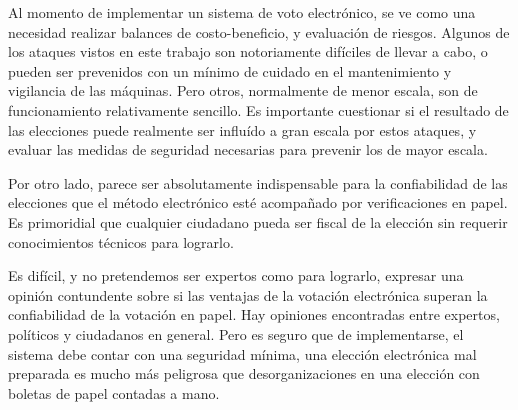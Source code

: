 \documentclass[11pt]{article}
\begin{document}
Al momento de implementar un sistema de voto electrónico, se ve como una necesidad realizar balances de costo-beneficio, y evaluación de riesgos. Algunos de los ataques vistos en este trabajo son notoriamente difíciles de llevar a cabo, o pueden ser prevenidos con un mínimo de cuidado en el mantenimiento y vigilancia de las máquinas. Pero otros, normalmente de menor escala, son de funcionamiento relativamente sencillo. Es importante cuestionar si el resultado de las elecciones puede realmente ser influído a gran escala por estos ataques, y evaluar las medidas de seguridad necesarias para prevenir los de mayor escala.

Por otro lado, parece ser absolutamente indispensable para la confiabilidad de las elecciones que el método electrónico esté acompañado por verificaciones en papel. Es primoridial que cualquier ciudadano pueda ser fiscal de la elección sin requerir conocimientos técnicos para lograrlo.

Es difícil, y no pretendemos ser expertos como para lograrlo, expresar una opinión contundente sobre si las ventajas de la votación electrónica superan la confiabilidad de la votación en papel. Hay opiniones encontradas entre expertos, políticos y ciudadanos en general. Pero es seguro que de implementarse, el sistema debe contar con una seguridad mínima, una elección electrónica mal preparada es mucho más peligrosa que desorganizaciones en una elección con boletas de papel contadas a mano.

\pagebreak
\printbibliography
\end{document}
